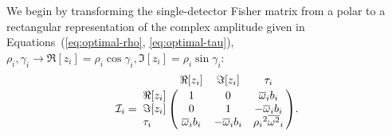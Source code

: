 \documentclass[amsmath,amssymb,aps,prx,reprint,nopreprintnumbers,nofootinbib]{revtex4-1}
\begin{document}
We begin by transforming the single\nobreakdashes-detector Fisher matrix from a polar to a rectangular representation of the complex amplitude given in Equations~(\ref{eq:optimal-rho}, \ref{eq:optimal-tau}), $\rho_i, \gamma_i \rightarrow \Re[z_i] = \rho_i \cos \gamma_i, \Im[z_i] = \rho_i \sin \gamma_i$:
%
\begin{equation}\label{eq:fisher-matrix-extrinsic-one-detector-cartesian}
    \mathcal{I}_i = \bordermatrix{
        ~ & \Re[z_i] & \Im[z_i] & \tau_i \cr
        \Re[z_i] &
        1 &
        0 &
        {\overline{\omega}}_i b_i \cr
        \Im[z_i] &
        0 &
        1 &
        -{\overline{\omega}}_i b_i \cr
        \tau_i &
        {\overline{\omega}}_i b_i &
        -{\overline{\omega}}_i b_i &
        {\rho_i}^2 {\overline{\omega^2}}_i
    }.
\end{equation}
\end{document}
